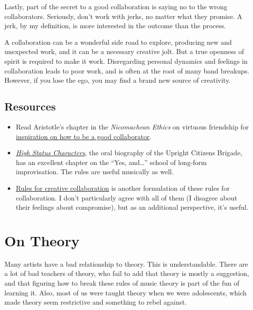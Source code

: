 \documentclass[
]{book}
\providecommand{\tightlist}{%
  \setlength{\itemsep}{0pt}\setlength{\parskip}{0pt}}
\begin{document}
Lastly, part of the secret to a good collaboration is saying no to the wrong collaborators. Seriously, don't work with jerks, no matter what they promise. A jerk, by my definition, is more interested in the outcome than the process.

A collaboration can be a wonderful side road to explore, producing new and unexpected work, and it can be a necessary creative jolt. But a true openness of spirit is required to make it work. Disregarding personal dynamics and feelings in collaboration leads to poor work, and is often at the root of many band breakups. However, if you lose the ego, you may find a brand new source of creativity.

\hypertarget{resources-5}{%
\section{Resources}\label{resources-5}}

\begin{itemize}
\tightlist
\item
  Read Aristotle's chapter in the \emph{Nicomachean Ethics} on virtuous friendship for \href{http://cantory.blogspot.com/2007/12/aristotle-and-his-view-of-friendship.html}{inspiration on how to be a good collaborator}.
\item
  \href{http://www.goodreads.com/book/show/18050769-high-status-characters}{\emph{High Status Characters}}, the oral biography of the Upright Citizens Brigade, has an excellent chapter on the ``Yes, and\ldots{}'' school of long-form improvisation. The rules are useful musically as well.
\item
  \href{http://openendedgroup.com/images/CreativeCollaboration_OpenEndedGroup.pdf}{Rules for creative collaboration} is another formulation of these rules for collaboration. I don't particularly agree with all of them (I disagree about their feelings about compromise), but as an additional perspective, it's useful.
\end{itemize}

\hypertarget{on-theory}{%
\chapter{On Theory}\label{on-theory}}

Many artists have a bad relationship to theory. This is understandable. There are a lot of bad teachers of theory, who fail to add that theory is mostly a suggestion, and that figuring how to break these rules of music theory is part of the fun of learning it. Also, most of us were taught theory when we were adolescents, which made theory seem restrictive and something to rebel against.
\end{document}
